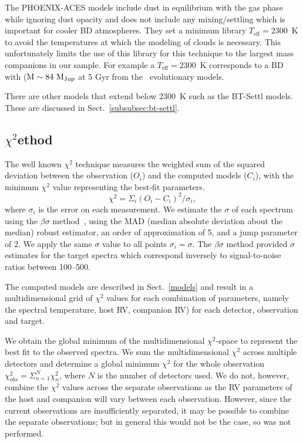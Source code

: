 \documentclass[fleqn,usenatbib]{mnras}
\begin{document}
The PHOENIX-ACES models include dust in equilibrium with the gas phase while ignoring dust opacity and does not include any mixing/settling which is important for cooler BD atmospheres. They set a minimum library \(T_{\textrm{eff}} = 2300\)~K to avoid the temperatures at which the modeling of clouds is necessary. This unfortunately limits the use of this library for this technique to the largest mass companions in our sample. For example a \(T_{\textrm{eff}}=2300\)~K corresponds to a BD with (\(\rm M\sim84~M_{Jup}\) at 5 Gyr from the~\citet{baraffe_evolutionary_2003} evolutionary models. 

There are other models that extend below 2300~K such as the BT-Settl models\citep{allard_btsettl_2013,baraffe_new_2015}. These are discussed in Sect.~\ref{subsubsec:bt-settl}.


\subsection{\texorpdfstring{\(\chi^{2}\)} method}
\label{subsec:chi2}
The well known \(\chi^{2} \) technique measures the weighted sum of the squared deviation between the observation (\({O}_{i}\)) and the computed models (\(C_{i}\)), with the minimum \(\chi^2\) value representing the best-fit parameters.
\[\chi^{2} = {\Sigma}_i { (O_{i} - C_{i})}^2 / {\sigma}_{i}, \] where \({\sigma}_{i}\) is the error on each measurement. We estimate the \(\sigma\) of each spectrum using the \(\beta\sigma\) method~\citep{czesla_posteriori_2018}, using the MAD (median absolute deviation about the median) robust estimator, an order of approximation of 5, and a jump parameter of 2. We apply the same \(\sigma\) value to all points \({\sigma}_{i} = \sigma\). The \(\beta\sigma\) method provided \(\sigma\) estimates for the target spectra which correspond inversely to signal-to-noise ratios between 100--500.

The computed models are described in Sect.~\ref{models} and result in a multidimensional grid of \(\chi^2\) values for each combination of parameters, namely the spectral temperature, host RV, companion RV) for each detector, observation and target.

We obtain the global minimum of the multidimensional \(\chi^{2}\)-space to represent the best fit to the observed spectra. We sum the multidimensional \(\chi^{2} \) across multiple detectors and determine a global minimum \(\chi^{2} \) for the whole observation \(\chi^{2}_{obs} = \Sigma^{N}_{n=1} \chi^{2}_n \), where \(N\) is the number of detectors used. We do not, however, combine the \(\chi^{2} \) values across the separate observations as the RV parameters of the host and companion will vary between each observation. However, since the current observations are insufficiently separated, it may be possible to combine the separate observations; but in general this would not be the case, so was not performed.
\end{document}
